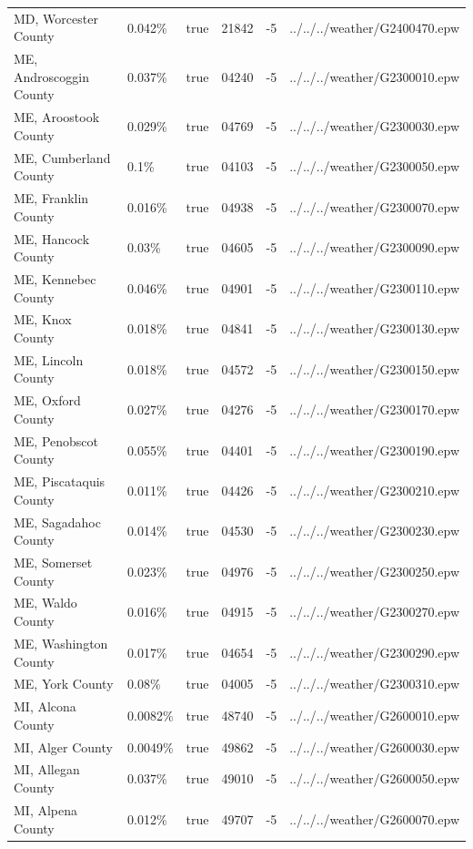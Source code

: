 \begin{longtable}[]{@{}llllll@{}}
MD, Worcester County & 0.042\% & true & 21842 & -5 &
../../../weather/G2400470.epw \\
ME, Androscoggin County & 0.037\% & true & 04240 & -5 &
../../../weather/G2300010.epw \\
ME, Aroostook County & 0.029\% & true & 04769 & -5 &
../../../weather/G2300030.epw \\
ME, Cumberland County & 0.1\% & true & 04103 & -5 &
../../../weather/G2300050.epw \\
ME, Franklin County & 0.016\% & true & 04938 & -5 &
../../../weather/G2300070.epw \\
ME, Hancock County & 0.03\% & true & 04605 & -5 &
../../../weather/G2300090.epw \\
ME, Kennebec County & 0.046\% & true & 04901 & -5 &
../../../weather/G2300110.epw \\
ME, Knox County & 0.018\% & true & 04841 & -5 &
../../../weather/G2300130.epw \\
ME, Lincoln County & 0.018\% & true & 04572 & -5 &
../../../weather/G2300150.epw \\
ME, Oxford County & 0.027\% & true & 04276 & -5 &
../../../weather/G2300170.epw \\
ME, Penobscot County & 0.055\% & true & 04401 & -5 &
../../../weather/G2300190.epw \\
ME, Piscataquis County & 0.011\% & true & 04426 & -5 &
../../../weather/G2300210.epw \\
ME, Sagadahoc County & 0.014\% & true & 04530 & -5 &
../../../weather/G2300230.epw \\
ME, Somerset County & 0.023\% & true & 04976 & -5 &
../../../weather/G2300250.epw \\
ME, Waldo County & 0.016\% & true & 04915 & -5 &
../../../weather/G2300270.epw \\
ME, Washington County & 0.017\% & true & 04654 & -5 &
../../../weather/G2300290.epw \\
ME, York County & 0.08\% & true & 04005 & -5 &
../../../weather/G2300310.epw \\
MI, Alcona County & 0.0082\% & true & 48740 & -5 &
../../../weather/G2600010.epw \\
MI, Alger County & 0.0049\% & true & 49862 & -5 &
../../../weather/G2600030.epw \\
MI, Allegan County & 0.037\% & true & 49010 & -5 &
../../../weather/G2600050.epw \\
MI, Alpena County & 0.012\% & true & 49707 & -5 &
../../../weather/G2600070.epw \\

\end{longtable}
